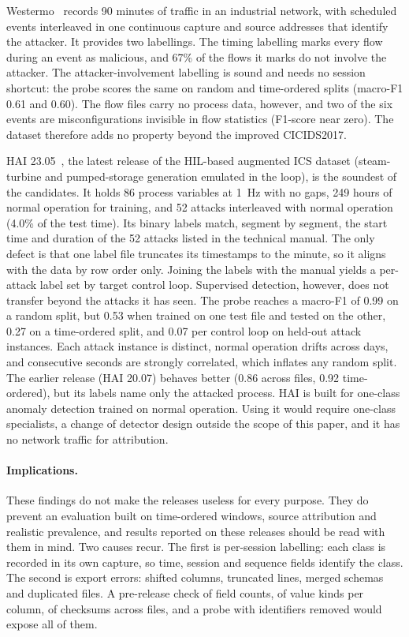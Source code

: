Westermo~\cite{westermo2023dataset} records 90 minutes of traffic in an industrial
network, with scheduled events interleaved in one continuous capture and source addresses
that identify the attacker. It provides two labellings. The timing labelling marks every
flow during an event as malicious, and 67\% of the flows it marks do not involve the
attacker. The attacker-involvement labelling is sound and needs no session shortcut: the
probe scores the same on random and time-ordered splits (macro-F1 0.61 and 0.60). The
flow files carry no process data, however, and two of the six events are
misconfigurations invisible in flow statistics (F1-score near zero). The dataset therefore
adds no property beyond the improved CICIDS2017.

HAI 23.05~\cite{shin2020hai}, the latest release of the HIL-based augmented ICS dataset
(steam-turbine and pumped-storage generation emulated in the loop), is the soundest of the
candidates. It holds 86 process variables at 1~Hz with no gaps, 249 hours of normal
operation for training, and 52 attacks interleaved with normal operation (4.0\% of the
test time). Its binary labels match, segment by segment, the start time and duration of
the 52 attacks listed in the technical manual. The only defect is that one label file
truncates its timestamps to the minute, so it aligns with the data by row order only.
Joining the labels with the manual yields a per-attack label set by target control loop.
Supervised detection, however, does not transfer beyond the attacks it has seen. The
probe reaches a macro-F1 of 0.99 on a random split, but 0.53 when trained on one test file
and tested on the other, 0.27 on a time-ordered split, and 0.07 per control loop on
held-out attack instances. Each attack instance is distinct, normal operation drifts
across days, and consecutive seconds are strongly correlated, which inflates any random
split. The earlier release (HAI 20.07) behaves better (0.86 across files, 0.92
time-ordered), but its labels name only the attacked process. HAI is built for one-class
anomaly detection trained on normal operation. Using it would require one-class
specialists, a change of detector design outside the scope of this paper, and it has no
network traffic for attribution.

\paragraph{Implications.}
These findings do not make the releases useless for every purpose. They do prevent an
evaluation built on time-ordered windows, source attribution and realistic prevalence,
and results reported on these releases should be read with them in mind. Two causes
recur. The first is per-session labelling: each class is recorded in its own capture, so
time, session and sequence fields identify the class. The second is export errors:
shifted columns, truncated lines, merged schemas and duplicated files. A pre-release
check of field counts, of value kinds per column, of checksums across files, and a
probe with identifiers removed would expose all of them.

